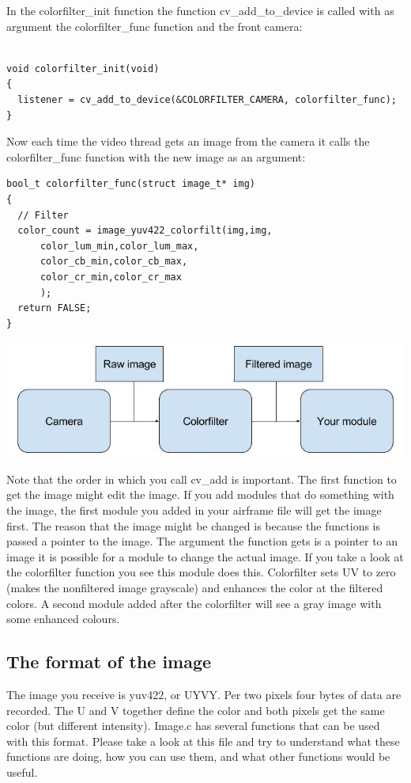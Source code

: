 \documentclass{article}
\begin{document}
In the colorfilter\_init function the function cv\_add\_to\_device is called with as argument the colorfilter\_func function and the front camera:
\begin{verbatim}

void colorfilter_init(void)
{
  listener = cv_add_to_device(&COLORFILTER_CAMERA, colorfilter_func);
}

\end{verbatim}
Now each time the video thread gets an image from the camera it calls the colorfilter\_func function with the new image as an argument:
\begin{verbatim}
bool_t colorfilter_func(struct image_t* img)
{
  // Filter
  color_count = image_yuv422_colorfilt(img,img,
      color_lum_min,color_lum_max,
      color_cb_min,color_cb_max,
      color_cr_min,color_cr_max
      );
  return FALSE;
}
\end{verbatim}
\includegraphics[width=0.8\linewidth]{camerafilter}

Note that the order in which you call cv\_add is important. The first function to get the image might edit the image. If you add modules that do something with the image, the first module you added in your airframe file will get the image first. The reason that the image might be changed is because the functions is passed a pointer to the image. 
The argument the function gets is a pointer to an image it is possible for a module to change the actual image. If you take a look at the colorfilter function you see this module does this. Colorfilter sets UV to zero (makes the nonfiltered image grayscale) and enhances the color at the filtered colors. A second module added after the colorfilter will see a gray image with some enhanced colours. 

\subsection*{The format of the image}
The image you receive is yuv422, or UYVY. Per two pixels four bytes of data are recorded. The U and V together define the color and both pixels get the same color (but different intensity). Image.c has several functions that can be used with this format. Please take a look at this file and try to understand what these functions are doing, how you can use them, and what other functions would be useful. 
\end{document}
